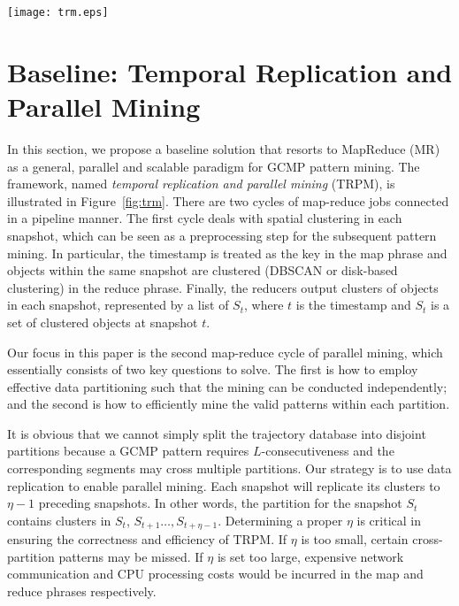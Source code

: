 \begin{figure*} [t]
\center
\texttt{[image: trm.eps]}
\caption{Work flow of Temporal Replication and Mining. (a)(b) correspond to the first map-reduce cycle which clusters objects in each snapshot;  (c)(d) correspond to the second map-reduce cycle which uses temporal replication to mine GCMP in parallel.}
\label{fig:trm}
\end{figure*}

\section{Baseline: Temporal Replication and Parallel Mining}
\label{sec:trm}
In this section, we propose a baseline solution that resorts to MapReduce (MR) as a general, parallel and scalable paradigm for GCMP pattern mining. The framework, named \textit{temporal replication and parallel mining} (TRPM), is illustrated in   Figure~\ref{fig:trm}. There are two cycles of map-reduce jobs connected in a pipeline manner. The first cycle deals with spatial clustering in each snapshot, which can be seen as a preprocessing step for the subsequent pattern mining. In particular, the timestamp is treated as the key in the map phrase and objects within the same snapshot are clustered (DBSCAN or disk-based clustering) in the reduce phrase. Finally, the reducers output clusters of objects in each snapshot, represented by a list of $S_t$, where $t$ is the timestamp and $S_t$ is a set of clustered objects at snapshot $t$. 


Our focus in this paper is the second map-reduce cycle of parallel mining, which essentially consists of two key questions to solve. The first is how to employ effective data partitioning such that the mining can be conducted independently; and the second is how to efficiently mine the valid patterns within each partition. 


It is obvious that we cannot simply split the trajectory database 
into disjoint partitions because a GCMP pattern requires $L$-consecutiveness 
and the corresponding segments may cross multiple partitions. 
Our strategy is to use data replication to enable parallel mining. 
Each snapshot will replicate its clusters to $\eta-1$ preceding snapshots.
In other words, the partition for the snapshot $S_t$ contains clusters 
in $S_t$, $S_{t+1}\ldots,S_{t+\eta-1}$. 
Determining a proper $\eta$ is critical in ensuring the
correctness and efficiency of TRPM. If $\eta$ is too small, 
certain cross-partition patterns may be missed. 
If $\eta$ is set too large, expensive network communication and 
CPU processing costs would be incurred in the map and reduce phrases respectively. 

